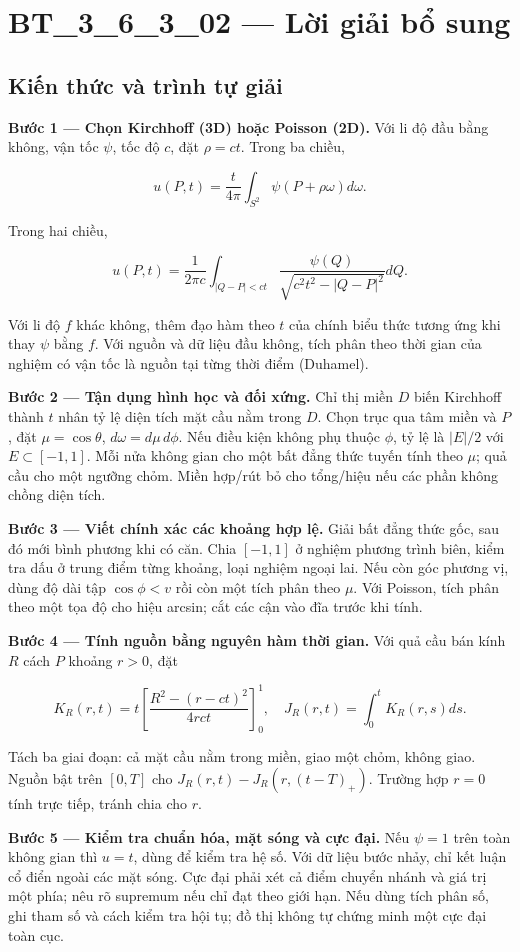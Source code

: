 \documentclass[10pt,a4paper]{article}
\begin{document}
\section*{BT\_3\_6\_3\_02 — Lời giải bổ sung}
\subsection*{Kiến thức và trình tự giải}
\textbf{Bước 1 — Chọn Kirchhoff (3D) hoặc Poisson (2D).} Với li độ đầu bằng không, vận tốc $\psi$, tốc độ $c$, đặt $\rho=ct$. Trong ba chiều,


\[
u(P,t)=\frac t{4\pi}\int_{S^2}\psi(P+\rho\omega)d\omega.
\]


Trong hai chiều,


\[
u(P,t)=\frac1{2\pi c}\int_{|Q-P|<ct}\frac{\psi(Q)}{\sqrt{c^2t^2-|Q-P|^2}}dQ.
\]


Với li độ $f$ khác không, thêm đạo hàm theo $t$ của chính biểu thức tương ứng khi thay $\psi$ bằng $f$. Với nguồn và dữ liệu đầu không, tích phân theo thời gian của nghiệm có vận tốc là nguồn tại từng thời điểm (Duhamel).

\textbf{Bước 2 — Tận dụng hình học và đối xứng.} Chỉ thị miền $D$ biến Kirchhoff thành $t$ nhân tỷ lệ diện tích mặt cầu nằm trong $D$. Chọn trục qua tâm miền và $P$, đặt $\mu=\cos\theta$, $d\omega=d\mu\,d\phi$. Nếu điều kiện không phụ thuộc $\phi$, tỷ lệ là $|E|/2$ với $E\subset[-1,1]$. Mỗi nửa không gian cho một bất đẳng thức tuyến tính theo $\mu$; quả cầu cho một ngưỡng chỏm. Miền hợp/rút bỏ cho tổng/hiệu nếu các phần không chồng diện tích.

\textbf{Bước 3 — Viết chính xác các khoảng hợp lệ.} Giải bất đẳng thức gốc, sau đó mới bình phương khi có căn. Chia $[-1,1]$ ở nghiệm phương trình biên, kiểm tra dấu ở trung điểm từng khoảng, loại nghiệm ngoại lai. Nếu còn góc phương vị, dùng độ dài tập $\cos\phi<v$ rồi còn một tích phân theo $\mu$. Với Poisson, tích phân theo một tọa độ cho hiệu arcsin; cắt các cận vào đĩa trước khi tính.

\textbf{Bước 4 — Tính nguồn bằng nguyên hàm thời gian.} Với quả cầu bán kính $R$ cách $P$ khoảng $r>0$, đặt


\[
K_R(r,t)=t\left[\frac{R^2-(r-ct)^2}{4rct}\right]_0^1,\quad J_R(r,t)=\int_0^tK_R(r,s)ds.
\]


Tách ba giai đoạn: cả mặt cầu nằm trong miền, giao một chỏm, không giao. Nguồn bật trên $[0,T]$ cho $J_R(r,t)-J_R(r,(t-T)_+)$. Trường hợp $r=0$ tính trực tiếp, tránh chia cho $r$.

\textbf{Bước 5 — Kiểm tra chuẩn hóa, mặt sóng và cực đại.} Nếu $\psi=1$ trên toàn không gian thì $u=t$, dùng để kiểm tra hệ số. Với dữ liệu bước nhảy, chỉ kết luận cổ điển ngoài các mặt sóng. Cực đại phải xét cả điểm chuyển nhánh và giá trị một phía; nêu rõ supremum nếu chỉ đạt theo giới hạn. Nếu dùng tích phân số, ghi tham số và cách kiểm tra hội tụ; đồ thị không tự chứng minh một cực đại toàn cục.
\end{document}
